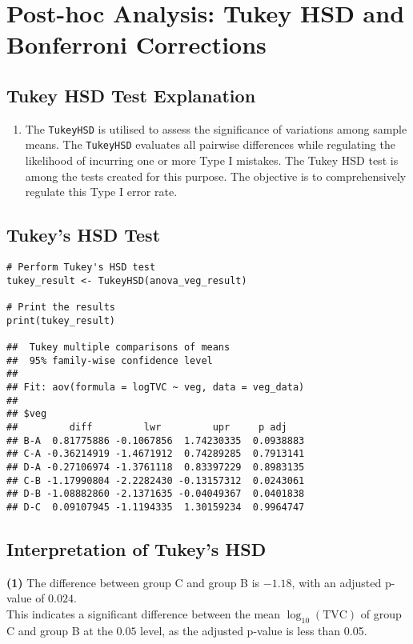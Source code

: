 \documentclass{article}
\begin{document}
\section*{Post-hoc Analysis: Tukey HSD and Bonferroni Corrections}
\subsection*{Tukey HSD Test Explanation}

\begin{enumerate}
    \item The \texttt{TukeyHSD} is utilised to assess the significance of variations among sample means. The \texttt{TukeyHSD} evaluates all pairwise differences while regulating the likelihood of incurring one or more Type I mistakes. The Tukey HSD test is among the tests created for this purpose. The objective is to comprehensively regulate this Type I error rate.
\end{enumerate}
\subsection*{Tukey's HSD Test}

\begin{verbatim}
# Perform Tukey's HSD test
tukey_result <- TukeyHSD(anova_veg_result)

# Print the results
print(tukey_result)

##  Tukey multiple comparisons of means
##  95% family-wise confidence level
##
## Fit: aov(formula = logTVC ~ veg, data = veg_data)
##
## $veg
##         diff         lwr         upr     p adj
## B-A  0.81775886 -0.1067856  1.74230335  0.0938883
## C-A -0.36214919 -1.4671912  0.74289285  0.7913141
## D-A -0.27106974 -1.3761118  0.83397229  0.8983135
## C-B -1.17990804 -2.2282430 -0.13157312  0.0243061
## D-B -1.08882860 -2.1371635 -0.04049367  0.0401838
## D-C  0.09107945 -1.1194335  1.30159234  0.9964747
\end{verbatim}

\subsection*{Interpretation of Tukey's HSD}

\noindent
\textbf{(1)} The difference between group C and group B is $-1.18$, with an adjusted p-value of $0.024$. \\
This indicates a significant difference between the mean $\log_{10}(\text{TVC})$ of group C and group B at the $0.05$ level, as the adjusted p-value is less than 0.05.
\end{document}

